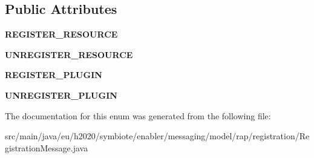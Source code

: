 \subsection*{Public Attributes}
\begin{DoxyCompactItemize}
\item 
\mbox{\label{enumeu_1_1h2020_1_1symbiote_1_1enabler_1_1messaging_1_1model_1_1rap_1_1registration_1_1Registrat1f4e4e7672b628dc11e563cd077b2d6a_a322ce9ebc486dd48b6d3b579a39717a3}} 
{\bfseries R\+E\+G\+I\+S\+T\+E\+R\+\_\+\+R\+E\+S\+O\+U\+R\+CE}
\item 
\mbox{\label{enumeu_1_1h2020_1_1symbiote_1_1enabler_1_1messaging_1_1model_1_1rap_1_1registration_1_1Registrat1f4e4e7672b628dc11e563cd077b2d6a_a5b564de19448d2220ae6aa00694a6599}} 
{\bfseries U\+N\+R\+E\+G\+I\+S\+T\+E\+R\+\_\+\+R\+E\+S\+O\+U\+R\+CE}
\item 
\mbox{\label{enumeu_1_1h2020_1_1symbiote_1_1enabler_1_1messaging_1_1model_1_1rap_1_1registration_1_1Registrat1f4e4e7672b628dc11e563cd077b2d6a_ab53a99e53165f1d5f00c851b74757567}} 
{\bfseries R\+E\+G\+I\+S\+T\+E\+R\+\_\+\+P\+L\+U\+G\+IN}
\item 
\mbox{\label{enumeu_1_1h2020_1_1symbiote_1_1enabler_1_1messaging_1_1model_1_1rap_1_1registration_1_1Registrat1f4e4e7672b628dc11e563cd077b2d6a_a60f8628ea7a6db2d469fd6e817b8c7f8}} 
{\bfseries U\+N\+R\+E\+G\+I\+S\+T\+E\+R\+\_\+\+P\+L\+U\+G\+IN}
\end{DoxyCompactItemize}


The documentation for this enum was generated from the following file\+:\begin{DoxyCompactItemize}
\item 
src/main/java/eu/h2020/symbiote/enabler/messaging/model/rap/registration/Registration\+Message.\+java\end{DoxyCompactItemize}
